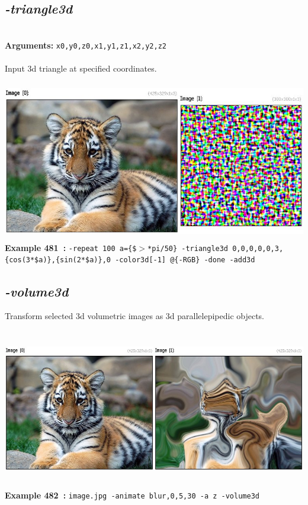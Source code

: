 \documentclass[a4paper,11pt,twoside]{book}
\begin{document}
\subsection{\emph{-triangle3d} }\vspace*{-0.5em}
~\\\textbf{Arguments: } 
{\small \texttt{x0,y0,z0,x1,y1,z1,x2,y2,z2}}\\~\\
Input 3d triangle at specified coordinates.
\begin{center}\includegraphics[keepaspectratio=true,height=7cm,width=\textwidth]{img/gmic_def481.jpg}\\
{\footnotesize \textbf{Example 481~:} \texttt{-repeat 100 a=\{\$$>$*pi/50\} -triangle3d 0,0,0,0,0,3,\{cos(3*\$a)\},\{sin(2*\$a)\},0 -color3d[-1] @\{-RGB\} -done -add3d}}
\end{center}

\subsection{\emph{-volume3d} }\vspace*{-0.5em}
Transform selected 3d volumetric images as 3d parallelepipedic objects.
\begin{center}\includegraphics[keepaspectratio=true,height=7cm,width=\textwidth]{img/gmic_def482.jpg}\\
{\footnotesize \textbf{Example 482~:} \texttt{image.jpg -animate blur,0,5,30 -a z -volume3d}}
\end{center}
\end{document}

